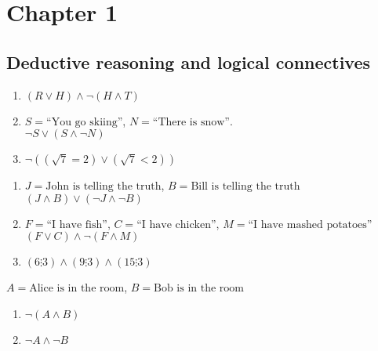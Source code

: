 \section{Chapter 1}
\subsection{Deductive reasoning and logical connectives}
\begin{exx}
  \begin{enumerate}[label=(\alph*)]
    \item $(R\lor H) \land \lnot(H \land T)$
    \item $S = \text{``You go skiing''}$, $N = \text{``There is snow''}$.\\
    $\lnot S \lor (S \land \lnot N)$
    \item $\lnot((\sqrt{7}=2)\lor (\sqrt{7}<2))$
  \end{enumerate}
\end{exx}

\begin{exx}
  \begin{enumerate}[label=(\alph*)]
    \item $J=\text{John is telling the truth}$, $B=\text{Bill is telling the truth}$ \\
    $(J\land B)\lor (\lnot J \land \lnot B)$
    \item $F=\text{``I have fish''}$, $C=\text{``I have chicken''}$, $M=\text{``I have mashed potatoes''}$ \\
    $(F \lor C) \land \lnot(F \land M)$
    \item $(6 \vdots 3) \land (9\vdots 3) \land (15 \vdots 3)$
  \end{enumerate}
\end{exx}

\begin{exx}
  $A=\text{Alice is in the room}$, $B=\text{Bob is in the room}$
  \begin{enumerate}[label=(\alph*)]
    \item $\lnot(A \land B)$
    \item $\lnot A \land \lnot B$
  \end{enumerate}
\end{exx}
